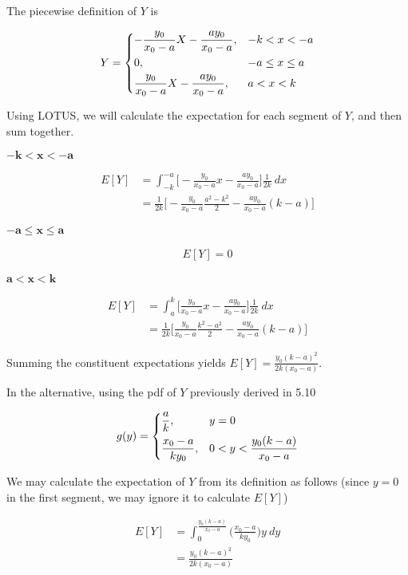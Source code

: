 \documentclass[10pt, oneside]{article}   	%
\theoremstyle{definition}
\begin{document}
\begin{enumerate}[label=7.\arabic*]
\begin{enumerate}
	The piecewise definition of $Y$ is
	
	\[ Y = \begin{dcases}
	-\frac{y_0}{x_0 - a} X - \frac{ay_0}{x_0 - a}, & -k < x < -a \\
	0, &-a \leq x \leq a \\
	\frac{y_0}{x_0 - a} X - \frac{ay_0}{x_0 - a}, &a < x < k
	\end{dcases} \]
	
	Using LOTUS, we will calculate the expectation for each segment of $Y$, and then sum together.
	
	$\bm{ -k < x < -a }$
	
	\begin{align*}
	E[Y] &= \int^{-a}_{-k} \Big[ -\frac{y_0}{x_0-a} x - \frac{ay_0}{x_0-a} \Big] \frac{1}{2k} \ dx \\
	&= \frac{1}{2k} \Big[ -\frac{y_0}{x_0 - a} \frac{a^2-k^2}{2} - \frac{ay_0}{x_0 - a} (k-a) \Big]
	\end{align*}
	
	$\bm{-a \leq x \leq a}$
	
	\begin{align*}
	E[Y] = 0
	\end{align*}
	
	$\bm{a < x < k}$
	
	\begin{align*}
	E[Y] &= \int^k_a \Big[ \frac{y_0}{x_0 - a} x - \frac{ay_0}{x_0 - a} \Big] \frac{1}{2k} \ dx \\
	&= \frac{1}{2k} \Big[ \frac{y_0}{x_0 - a} \frac{k^2 - a^2}{2} - \frac{ay_0}{x_0 - a} (k - a) \Big]
	\end{align*}
	
	Summing the constituent expectations yields $\boxed{E[Y] = \frac{y_0 (k-a)^2}{2k (x_0 - a)}}$.
	
	In the alternative, using the pdf of $Y$ previously derived in 5.10
	
	\[ g(y) = \begin{dcases}
	\frac{a}{k}, & y = 0 \\
	\frac{x_0 - a}{k y_0}, & 0 < y < \frac{y_0 (k-a)}{x_0 - a}
	\end{dcases} \]
	
	We may calculate the expectation of $Y$ from its definition as follows (since $y=0$ in the first segment, we may ignore it to calculate $E[Y]$)
	
	\begin{align*}
	E[Y] &= \int^{\frac{y_0 (k-a)}{x_0 - a}}_0 \Big( \frac{x_0 - a}{k y_0} \Big) y \ dy \\
	&= \boxed{\frac{y_0 (k-a)^2}{2k (x_0 - a)}}
	\end{align*}
	

\end{enumerate}
\end{enumerate}
\end{document}

